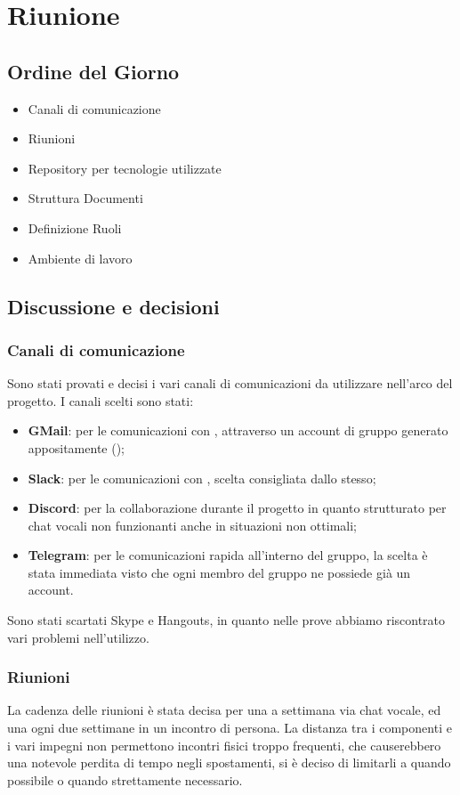 \section{Riunione}
\subsection{Ordine del Giorno}
\begin{itemize}
	\item Canali di comunicazione
	\item Riunioni
	\item Repository per tecnologie utilizzate
	\item Struttura Documenti
	\item Definizione Ruoli
	\item Ambiente di lavoro
\end{itemize}

\subsection{Discussione e decisioni}
\subsubsection{Canali di comunicazione}
Sono stati provati e decisi i  vari canali di comunicazioni da utilizzare nell'arco del progetto.
I canali scelti sono stati:
\begin{itemize}
	\item \textbf{GMail}: per le comunicazioni con \CommittenteInline{}, attraverso un account di gruppo generato appositamente (\GroupEmail{});
	\item \textbf{Slack}: per le comunicazioni con \Proponente{}, scelta consigliata dallo stesso;
	\item \textbf{Discord}: per la collaborazione durante il progetto in quanto strutturato per chat vocali non funzionanti anche in situazioni non ottimali;
	\item \textbf{Telegram}: per le comunicazioni rapida all'interno del gruppo, la scelta è stata immediata visto che ogni membro del gruppo ne possiede già un account.
\end{itemize}
Sono stati scartati Skype e Hangouts, in quanto nelle prove abbiamo riscontrato vari problemi nell'utilizzo.

\subsubsection{Riunioni}
La cadenza delle riunioni è stata decisa per una a settimana via chat vocale, ed una ogni due settimane in un incontro di persona.
La distanza tra i componenti e i vari impegni non permettono incontri fisici troppo frequenti, che causerebbero una notevole perdita di tempo negli spostamenti, si è deciso di limitarli a quando possibile o quando strettamente necessario.

